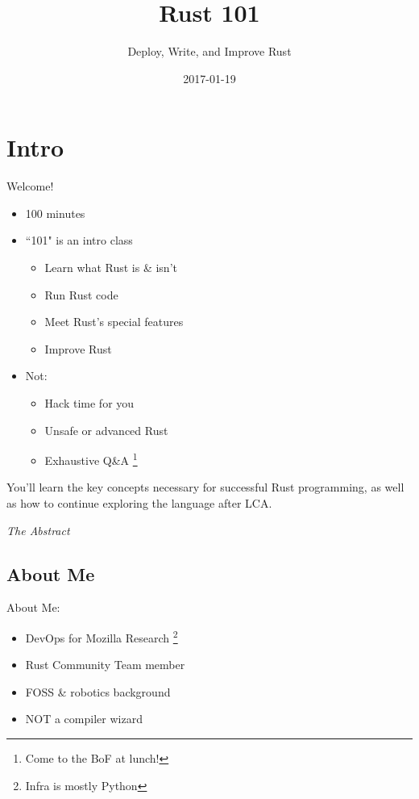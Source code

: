 \documentclass[100pt]{beamer}
\title[Rust 101]{Rust 101}
\subtitle{Deploy, Write, and Improve Rust}
\author{\name}
\date{2017-01-19}
\begin{document}
\begin{frame}
\titlepage
\end{frame}

\section{Intro}

\begin{frame}
    Welcome!
     \begin{itemize}
        \item 100 minutes
        \item ``101" is an intro class
        \begin{itemize}
            \item Learn what Rust is \& isn't
            \item Run Rust code
            \item Meet Rust's special features
            \item Improve Rust
        \end{itemize}
        \item Not:
        \begin{itemize}
            \item Hack time for you
            \item Unsafe or advanced Rust
            \item Exhaustive Q\&A \footnote{Come to the BoF at lunch!}
        \end{itemize}
    \end{itemize}
\end{frame}

\begin{frame}

\epigraph{You'll learn the key concepts necessary for successful Rust
programming, as well as how to continue exploring the language after
LCA.}{\textit{The Abstract}}

\end{frame}

\subsection{About Me}

\begin{frame}
    About Me:
    \begin{itemize}
        \item DevOps for Mozilla Research \footnote{Infra is mostly Python}
        \item Rust Community Team member
        \item FOSS \& robotics background
        \item NOT a compiler wizard
    \end{itemize}
\end{frame}
\end{document}
